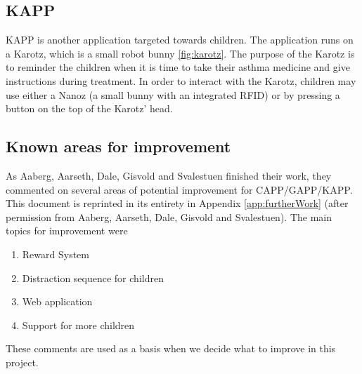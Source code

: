 

\subsection{KAPP}
KAPP is another application targeted towards children. The application runs on a Karotz\cite{karotz}, which is a small robot bunny \ref{fig:karotz}. The purpose of the Karotz is to reminder the children when it is time to take their asthma medicine and give instructions during treatment. In order to interact with the Karotz, children may use either a Nanoz (a small bunny with an integrated RFID) or by pressing a button on the top of the Karotz' head.    



\subsection{Known areas for improvement}
\label{sec:improvements}
As Aaberg, Aarseth, Dale, Gisvold and Svalestuen finished their work, they commented on several areas of potential improvement for CAPP/GAPP/KAPP. This document is reprinted in its entirety in Appendix \ref{app:furtherWork} (after permission from Aaberg, Aarseth, Dale, Gisvold and Svalestuen). The main topics for improvement were
\begin{enumerate}
\item{Reward System}
\item{Distraction sequence for children}
\item{Web application}
\item{Support for more children}
\end{enumerate}

These comments are used as a basis when we decide what to improve in this project. 





